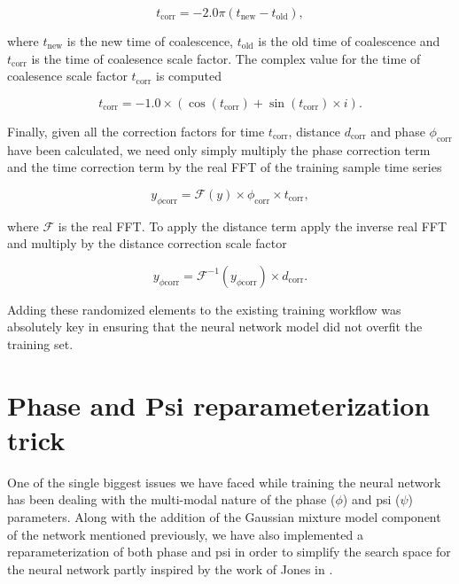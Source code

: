 \begin{equation}
    t_{\textrm{corr}} = -2.0\pi (t_{\textrm{new}} - t_{\textrm{old}}),
\end{equation}

where $t_{\textrm{new}}$ is the new time of coalescence, $t_{\textrm{old}}$ 
is the old time of coalescence and $t_{\textrm{corr}}$ is the time of coalesence scale factor. The complex value for the time of coalesence 
scale factor $t_{\textrm{corr}}$ is computed 

\begin{equation}
    t_{\textrm{corr}} = -1.0 \times (\cos(t_{\textrm{corr}}) + \sin(t_{\textrm{corr}}) \times i).
\end{equation}

Finally, given all the correction factors for time $t_{\textrm{corr}}$, 
distance $d_{\textrm{corr}}$ and phase $\phi_{\textrm{corr}}$ have been 
calculated, we need only simply multiply 
the phase correction term and the time correction term by the real 
\ac{FFT} of the training sample time series

\begin{equation}
    y_{\phi \textrm{corr}} = \mathcal{F}(y) \times \phi_{\textrm{corr}} \times t_{\textrm{corr}},
\end{equation}

where $\mathcal{F}$ is the real \ac{FFT}. To apply the distance term 
apply the inverse real \ac{FFT} and multiply by the distance correction 
scale factor

\begin{equation}
    y_{\phi \textrm{corr}} = \mathcal{F}^{-1}(y_{\phi \textrm{corr}}) \times d_{\textrm{corr}}. 
\end{equation}

Adding these randomized elements to the existing training workflow 
was absolutely key in ensuring that the neural network model did 
not overfit the training set.

\section{Phase and Psi reparameterization trick}\label{sec:phipsi_repar}

One of the single biggest issues we have faced while training the neural network 
has been dealing with the multi-modal nature of the phase ($\phi$) and psi 
($\psi$) parameters. Along with the addition of the Gaussian mixture model 
component of the network mentioned previously, we have also implemented 
a reparameterization of both phase and psi in order to simplify the 
search space for the neural network partly inspired by the work of Jones in \cite{10.1093/mnras/stv1584}.

